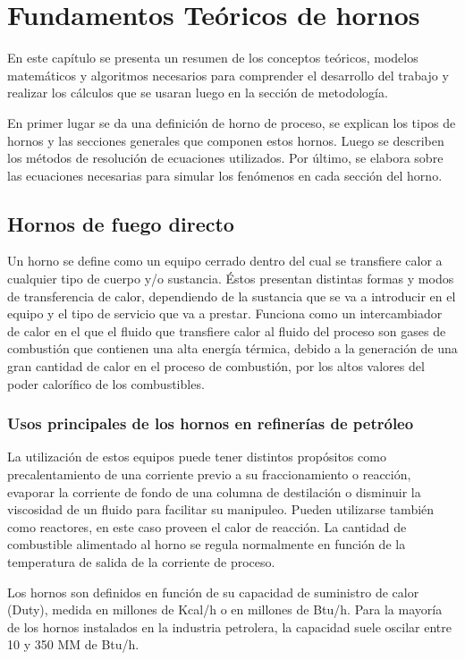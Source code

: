 \chapter{Fundamentos Teóricos de hornos}
\par En este capítulo se presenta un resumen de los conceptos teóricos, modelos matemáticos y algoritmos necesarios para comprender el desarrollo del trabajo y realizar los cálculos que se usaran luego en la sección de metodología.
\par En primer lugar se da una definición de horno de proceso, se explican los tipos de hornos y las secciones generales que componen estos hornos. Luego se describen los métodos de resolución de ecuaciones utilizados. Por último, se elabora sobre las ecuaciones necesarias para simular los fenómenos en cada sección del horno.

\section{Hornos de fuego directo}
\par Un horno se define como un equipo cerrado dentro del cual se transfiere calor a cualquier tipo de cuerpo y/o sustancia. Éstos presentan distintas formas y modos de transferencia de calor, dependiendo de la sustancia que se va a introducir en el equipo y el tipo de servicio que va a prestar. Funciona como un intercambiador de calor en el que el fluido que transfiere calor al fluido del proceso son gases de combustión que contienen una alta energía térmica, debido a la generación de una gran cantidad de calor en el proceso de combustión, por los altos valores del poder calorífico de los combustibles.\cite{bib:biset}

\subsection{Usos principales de los hornos en refinerías de petróleo}
\par La utilización de estos equipos puede tener distintos propósitos como precalentamiento de una corriente previo a su fraccionamiento o reacción, evaporar la corriente de fondo de una columna de destilación o disminuir la viscosidad de un fluido para facilitar su manipuleo.
Pueden utilizarse también como reactores, en este caso proveen el calor de reacción. La cantidad de combustible alimentado al horno se regula normalmente en función de la temperatura de salida de la corriente de proceso.
\par Los hornos son definidos en función de su capacidad de suministro de calor (Duty), medida en millones de Kcal/h o en millones de Btu/h. Para la mayoría de los hornos instalados en la industria petrolera, la capacidad suele oscilar entre 10 y 350 MM de Btu/h.

